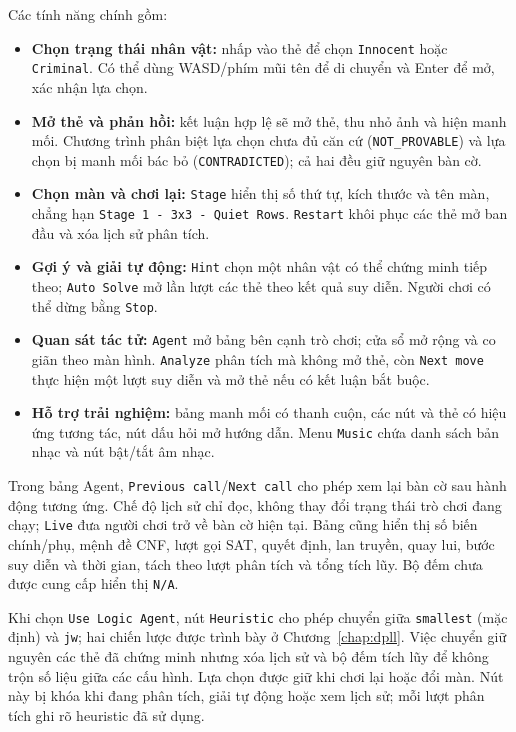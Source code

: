 Các tính năng chính gồm:
\begin{itemize}
    \item \textbf{Chọn trạng thái nhân vật:} nhấp vào thẻ để chọn \texttt{Innocent} hoặc \texttt{Criminal}. Có thể dùng WASD/phím mũi tên để di chuyển và Enter để mở, xác nhận lựa chọn.
    \item \textbf{Mở thẻ và phản hồi:} kết luận hợp lệ sẽ mở thẻ, thu nhỏ ảnh và hiện manh mối. Chương trình phân biệt lựa chọn chưa đủ căn cứ (\texttt{NOT\_PROVABLE}) và lựa chọn bị manh mối bác bỏ (\texttt{CONTRADICTED}); cả hai đều giữ nguyên bàn cờ.
    \item \textbf{Chọn màn và chơi lại:} \texttt{Stage} hiển thị số thứ tự, kích thước và tên màn, chẳng hạn \texttt{Stage 1 - 3x3 - Quiet Rows}. \texttt{Restart} khôi phục các thẻ mở ban đầu và xóa lịch sử phân tích.
    \item \textbf{Gợi ý và giải tự động:} \texttt{Hint} chọn một nhân vật có thể chứng minh tiếp theo; \texttt{Auto Solve} mở lần lượt các thẻ theo kết quả suy diễn. Người chơi có thể dừng bằng \texttt{Stop}.
    \item \textbf{Quan sát tác tử:} \texttt{Agent} mở bảng bên cạnh trò chơi; cửa sổ mở rộng và co giãn theo màn hình. \texttt{Analyze} phân tích mà không mở thẻ, còn \texttt{Next move} thực hiện một lượt suy diễn và mở thẻ nếu có kết luận bắt buộc.
    \item \textbf{Hỗ trợ trải nghiệm:} bảng manh mối có thanh cuộn, các nút và thẻ có hiệu ứng tương tác, nút dấu hỏi mở hướng dẫn. Menu \texttt{Music} chứa danh sách bản nhạc và nút bật/tắt âm nhạc.
\end{itemize}

Trong bảng Agent, \texttt{Previous call}/\texttt{Next call} cho phép xem lại bàn cờ sau hành động tương ứng. Chế độ lịch sử chỉ đọc, không thay đổi trạng thái trò chơi đang chạy; \texttt{Live} đưa người chơi trở về bàn cờ hiện tại. Bảng cũng hiển thị số biến chính/phụ, mệnh đề CNF, lượt gọi SAT, quyết định, lan truyền, quay lui, bước suy diễn và thời gian, tách theo lượt phân tích và tổng tích lũy. Bộ đếm chưa được cung cấp hiển thị \texttt{N/A}.

Khi chọn \texttt{Use Logic Agent}, nút \texttt{Heuristic} cho phép chuyển giữa \texttt{smallest} (mặc định) và \texttt{jw}; hai chiến lược được trình bày ở Chương~\ref{chap:dpll}. Việc chuyển giữ nguyên các thẻ đã chứng minh nhưng xóa lịch sử và bộ đếm tích lũy để không trộn số liệu giữa các cấu hình. Lựa chọn được giữ khi chơi lại hoặc đổi màn. Nút này bị khóa khi đang phân tích, giải tự động hoặc xem lịch sử; mỗi lượt phân tích ghi rõ heuristic đã sử dụng.

